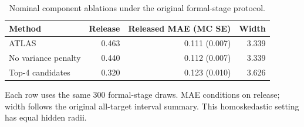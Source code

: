 \begin{table}[htbp]
\centering\small
\setlength{\tabcolsep}{4pt}
\caption{Nominal component ablations under the original formal-stage protocol.}
\label{tab:b-ablation}
\begin{tabular}{lrrr}
\toprule
Method & Release & Released MAE (MC SE) & Width \\
\midrule
ATLAS & 0.463 & 0.111 (0.007) & 3.339 \\
No variance penalty & 0.440 & 0.112 (0.007) & 3.339 \\
Top-4 candidates & 0.320 & 0.123 (0.010) & 3.626 \\
\bottomrule
\end{tabular}
\par\smallskip\begin{minipage}{0.97\linewidth}\footnotesize Each row uses the same 300 formal-stage draws. MAE conditions on release; width follows the original all-target interval summary. This homoskedastic setting has equal hidden radii.\end{minipage}
\end{table}
